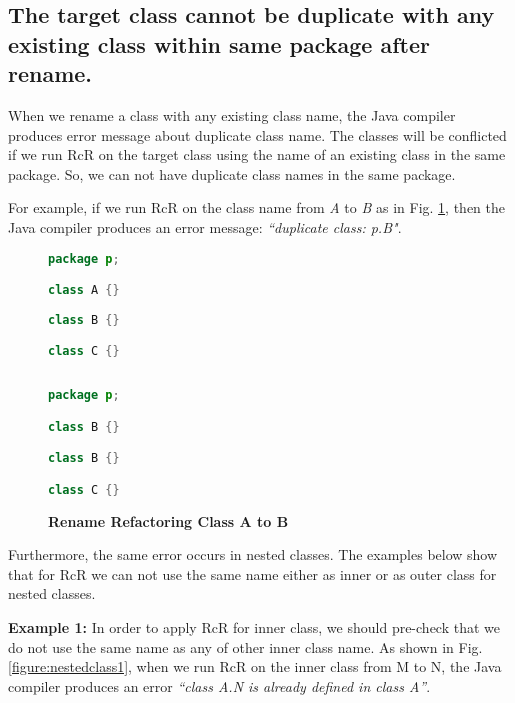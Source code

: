 \subsection{The target class cannot be duplicate with any existing class within same package after rename.}

When we rename a class with any existing class name, the Java compiler produces error message about duplicate class name. The classes will be conflicted if we run RcR on the target class using the name of an existing class in the same package. So, we can not have duplicate class names in the same package. 

For example, if we run RcR on the class name from \textsl{A} to \textsl{B} as in Fig. \ref{fig:afterrr}, then the Java compiler produces an error message: \textit{``duplicate class: p.B"}.

\begin{figure}[th]
\centering
\begin{minipage}[t]{0.45\linewidth}
\begin{lstlisting}[language=java, basicstyle=\scriptsize\ttfamily,frame=single]
package p;

class A {}
	
class B {}

class C {}
 
\end{lstlisting}
\end{minipage}
\hfill
\begin{minipage}[t]{0.45\linewidth}
\begin{lstlisting}[language=java, basicstyle=\scriptsize\ttfamily,frame=single]
package p;

class B {}	

class B {}

class C {}

\end{lstlisting}
\end{minipage}
\caption{\textbf{Rename Refactoring Class A to B}}
\label{fig:afterrr}
\end{figure}


Furthermore, the same error occurs in nested classes. The examples below show that for RcR we can not use the same name either as inner or as outer class for nested classes.


\textbf{Example 1:} In order to apply RcR for inner class, we should pre-check that we do not use the same name as any of other inner class name. As shown in Fig. \ref{figure:nestedclass1}, when we run RcR on the inner class from M to N, the Java compiler produces an error \textit{``class A.N is already defined in class A''}. 

